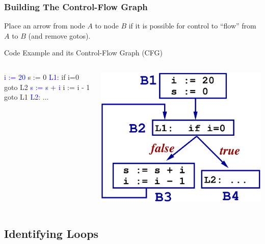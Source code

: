 \documentclass{beamer}
\newcommand{\blue}[1]{\textcolor{Blue}{{#1}}}
\newcommand{\emp}[1]{\textcolor{DikuRed}{ #1}}
\begin{document}
\begin{frame}[fragile,t]
    \frametitle{Building The Control-Flow Graph}


Place an arrow from node $A$ to node $B$ if it is possible 
for control to ``flow'' from $A$ to $B$ (and remove gotos).

\bigskip

\begin{block}{Code Example and its Control-Flow Graph ({\sc CFG})}
\begin{columns}
\begin{colorcode}[fontsize=\scriptsize]
    \blue{i := 20}
    s := 0
\blue{L1:} if i=0 \emp{goto L2}
    \blue{s := s + i}
    i := i - 1
    \emp{goto L1}
\blue{L2: ... }
\end{colorcode} 
\includegraphics[width=20ex]{Figures/CFGeg}
\end{columns}
\end{block}

\end{frame}


\subsection{Identifying Loops}
\end{document}
